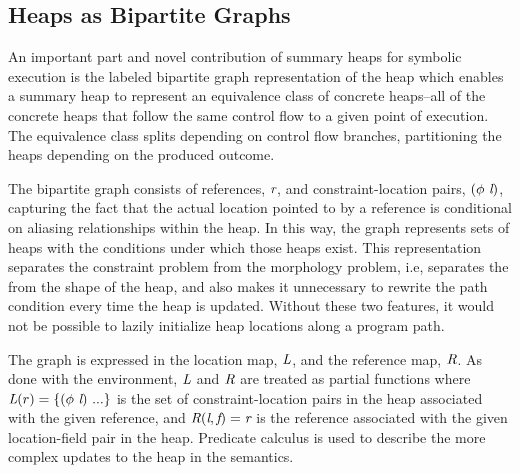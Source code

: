 \subsection{Heaps as Bipartite Graphs}
An important part and novel contribution of summary heaps for
symbolic execution is the labeled bipartite graph representation
of the heap which enables a summary heap to represent an equivalence class of
concrete heaps--all of the concrete heaps that follow the same control
flow to a given point of execution. The equivalence class splits depending 
on control flow branches, partitioning the heaps depending on the 
produced outcome. 

The bipartite graph consists of 
references, $\emph{r}$, and constraint-location pairs,
$(\phi\ \emph{l})$, capturing the fact that the
actual location pointed to by a reference is conditional on
aliasing relationships within the heap. In this way, the graph
represents sets of heaps with the conditions under which those heaps
exist. This representation separates the constraint
problem from the morphology problem, i.e, separates the 
from the shape of the heap, and also makes 
it unnecessary to rewrite the
path condition every time the heap is updated. Without these two
features,
it would not be possible to lazily initialize heap
locations along a program path. 

The graph is expressed in the location map, $\emph{L}$, and
the reference map, $\emph{R}$. As done with the environment,
$\emph{L}$ and $\emph{R}$ are treated as partial functions where
$\cfgnt{L}(r) = \{(\phi\ \cfgnt{l})\ ...\}$ is the set of
constraint-location pairs in the heap associated with the given
reference, and $\emph{R}(\emph{l},\emph{f}) = \emph{r}$ is the
reference associated with the given location-field pair in the
heap. Predicate calculus is used to describe the more complex updates
to the heap in the semantics.

